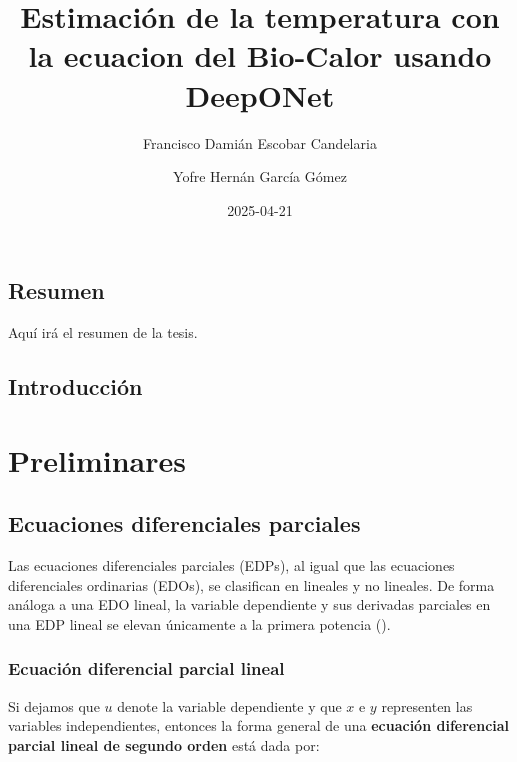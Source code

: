 \documentclass[
  spanish,
  us-letterpaper,
  DIV=11,
  numbers=noendperiod]{scrreprt}
\title{Estimación de la temperatura con la ecuacion del Bio-Calor usando
DeepONet}
\author{Francisco Damián Escobar Candelaria \and Yofre Hernán García
Gómez}
\date{2025-04-21}
\renewcommand*\contentsname{Tabla de contenidos}
\newcommand\contentsname{Tabla de contenidos}
\theoremstyle{definition}
\theoremstyle{plain}
\theoremstyle{remark}
\begin{document}
\maketitle

\renewcommand*\contentsname{Tabla de contenidos}
{
\hypersetup{linkcolor=}
\setcounter{tocdepth}{2}
\tableofcontents
}


\chapter*{Resumen}\label{resumen}


Aquí irá el resumen de la tesis.


\chapter{Introducción}\label{introducciuxf3n}

\part{Preliminares}

\chapter{Ecuaciones diferenciales
parciales}\label{ecuaciones-diferenciales-parciales}

Las ecuaciones diferenciales parciales (EDPs), al igual que las
ecuaciones diferenciales ordinarias (EDOs), se clasifican en lineales y
no lineales. De forma análoga a una EDO lineal, la variable dependiente
y sus derivadas parciales en una EDP lineal se elevan únicamente a la
primera potencia ().

\section{Ecuación diferencial parcial
lineal}\label{ecuaciuxf3n-diferencial-parcial-lineal}

Si dejamos que \(u\) denote la variable dependiente y que \(x\) e \(y\)
representen las variables independientes, entonces la forma general de
una \textbf{ecuación diferencial parcial lineal de segundo orden} está
dada por:
\end{document}
